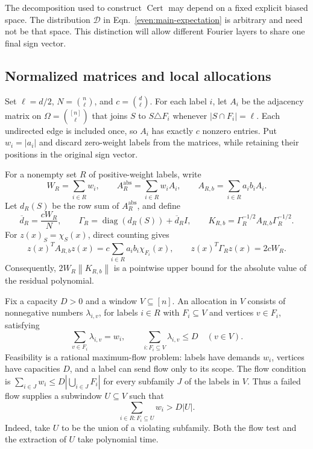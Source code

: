 \documentclass[letterpaper,11pt]{article}
\theoremstyle{definition}
\newcommand{\norm}[1]{\left\lVert#1\right\rVert}
\newcommand{\abs}[1]{\left|#1\right|}
\DeclareMathOperator{\diag}{diag}
\begin{document}
The decomposition used to construct $\operatorname{Cert}$ may depend on a
fixed explicit biased space. The distribution $\mathcal D$ in
Eqn.~\eqref{even:main-expectation} is arbitrary and need not be that space.
This distinction will allow different Fourier layers to share one final
sign vector.

\subsection{Normalized matrices and local allocations}

Set $\ell=d/2$, $N=\binom n\ell$, and $c=\binom d\ell$.
For each label $i$, let $A_i$ be the adjacency matrix on
$\Omega=\binom{[n]}\ell$ that joins $S$ to $S\triangle F_i$ whenever
$\abs{S\cap F_i}=\ell$. Each undirected edge is included once, so
$A_i$ has exactly $c$ nonzero entries. Put $w_i=\abs{a_i}$ and discard
zero-weight labels from the matrices, while retaining their positions in
the original sign vector.

For a nonempty set $R$ of positive-weight labels, write
\[
 W_R=\sum_{i\in R}w_i,\qquad
 A_R^{\mathrm{abs}}=\sum_{i\in R}w_i A_i,\qquad
 A_{R,b}=\sum_{i\in R}a_i b_i A_i.
\]
Let $d_R(S)$ be the row sum of $A_R^{\mathrm{abs}}$, and define
\begin{equation}\label{even:normalization}
 \overline d_R=\frac{cW_R}{N},\qquad
 \Gamma_R=\diag(d_R(S))+\overline d_R I,\qquad
 K_{R,b}=\Gamma_R^{-1/2}A_{R,b}\Gamma_R^{-1/2}.
\end{equation}
For $z(x)_S=\chi_S(x)$, direct counting gives
\begin{equation}\label{even:comparison}
 z(x)^T A_{R,b}z(x)=c\sum_{i\in R}a_i b_i\chi_{F_i}(x),
 \qquad z(x)^T\Gamma_Rz(x)=2cW_R.
\end{equation}
Consequently, $2W_R\norm{K_{R,b}}$ is a pointwise upper bound for the
absolute value of the residual polynomial.

Fix a capacity $D>0$ and a window $V\subseteq[n]$. An allocation in $V$
consists of nonnegative numbers $\lambda_{i,v}$, for labels $i\in R$
with $F_i\subseteq V$ and vertices $v\in F_i$, satisfying
\begin{equation}\label{even:allocation}
 \sum_{v\in F_i}\lambda_{i,v}=w_i,
 \qquad
 \sum_{i:F_i\subseteq V}\lambda_{i,v}\leq D
 \quad(v\in V).
\end{equation}
Feasibility is a rational maximum-flow problem: labels have demands $w_i$,
vertices have capacities $D$, and a label can send flow only to its scope.
The flow condition is
$\sum_{i\in J}w_i\leq D\abs{\bigcup_{i\in J}F_i}$ for every subfamily
$J$ of the labels in $V$. Thus a failed flow supplies a subwindow
$U\subseteq V$ such that
\begin{equation}\label{even:dense-window}
 \sum_{i\in R:F_i\subseteq U}w_i>D\abs U.
\end{equation}
Indeed, take $U$ to be the union of a violating subfamily. Both the flow
test and the extraction of $U$ take polynomial time.
\end{document}
